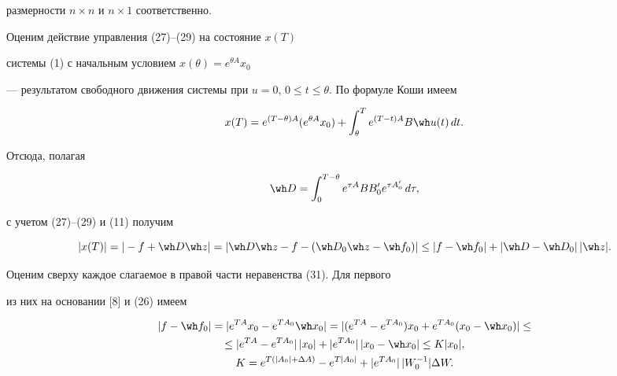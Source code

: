 размерности $n \times n$ и $n \times 1$ соответственно.





Оценим действие управления (27)--(29) на состояние $x(T)$


системы (1) с начальным условием $ x(\theta)= e^{\theta A}x_0 $


--- результатом свободного движения системы при $u=0$, $0 \le t \le


\theta$. По формуле Коши имеем


$$


x(T)=e^{(T-\theta) A} ( e^{\theta A}x_0 )+


\int_{\theta}^{T} e^{(T-t) A} B \wh u(t) \, dt.


$$


Отсюда, полагая


\begin{equation}


\wh D =\int_0^{T-\theta} e^{\tau A}B B_0'e^{\tau A_0'} \, d \tau,


\end{equation}


с учетом (27)--(29) и (11) получим


\begin{equation}


|x(T)|=|-f+\wh D \wh z |= | \wh D \wh z - f - (\wh D_0 \wh z -\wh f_0)|


\le |f-\wh f_0|+|\wh D -\wh D_0|\, |\wh z|.


\end{equation}





Оценим сверху каждое слагаемое в правой части неравенства (31). Для первого


из них на основании [8] и (26) имеем


\begin{gather}


|f-\wh f_0|=|e^{TA}x_0 - e^{TA_0}\wh x_0| =


|(e^{TA}-e^{TA_0})x_0+e^{TA_0}(x_0-\wh x_0)| \le \notag \\


%


\le |e^{TA}-e^{TA_0}|\,|x_0|+|e^{TA_0}|\, |x_0-\wh x_0| \le K |x_0|,\\


%


K= e^{T(|A_0|+\Delta A)}-e^{T|A_0|}+|e^{TA_0}|\,|W_0^{-1}| \Delta W.\notag


\end{gather}





